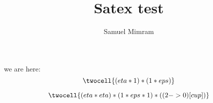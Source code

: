 \documentclass[a4paper]{article}
\title{Satex test}
\author{Samuel Mimram}
\begin{document}
\maketitle

we are here:
\[
  \twocell{(eta * 1) * (1 * eps)}
\]

\[
  \twocell{(eta * eta) * (1 * eps * 1) * ((2->0)[cup])}
\]





\end{document}
